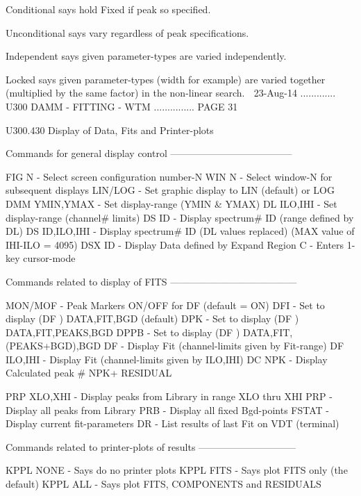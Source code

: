    Conditional says hold Fixed if peak so specified.
 
   Unconditional says vary regardless of peak specifications.
 
   Independent says given parameter-types are varied independently.
 
   Locked  says  given parameter-types (width for example) are varied together
          (multiplied by the same factor) in the non-linear search.
    
   23-Aug-14 ............. U300  DAMM - FITTING - WTM ............... PAGE  31
 
   U300.430  Display of Data, Fits and Printer-plots
 
   Commands for general display control --------------------------------------
 
   FIG    N           - Select screen configuration number-N
   WIN    N           - Select window-N for subsequent displays
   LIN/LOG            - Set graphic display to LIN (default) or LOG
   DMM    YMIN,YMAX   - Set display-range (YMIN & YMAX)
   DL     ILO,IHI     - Set display-range (channel# limits)
   DS     ID          - Display spectrum# ID (range defined by DL)
   DS     ID,ILO,IHI  - Display spectrum# ID (DL values replaced)
                        (MAX value of IHI-ILO = 4095)
   DSX    ID          - Display Data defined by Expand Region
   C                  - Enters 1-key cursor-mode
 
   Commands related to display of FITS ---------------------------------------
 
   MON/MOF            - Peak Markers ON/OFF for DF (default = ON)
   DFI                - Set to display (DF ) DATA,FIT,BGD (default)
   DPK                - Set to display (DF ) DATA,FIT,PEAKS,BGD
   DPPB               - Set to display (DF ) DATA,FIT,(PEAKS+BGD),BGD
   DF                 - Display Fit (channel-limits given by Fit-range)
   DF     ILO,IHI     - Display Fit (channel-limits given by ILO,IHI)
   DC     NPK         - Display Calculated peak #  NPK+ RESIDUAL
 
   PRP    XLO,XHI     - Display peaks from Library in range XLO thru XHI
   PRP                - Display all peaks from Library
   PRB                - Display all fixed Bgd-points
   FSTAT              - Display current fit-parameters
   DR                 - List results of last Fit on VDT (terminal)
 
   Commands related to printer-plots of results ------------------------------
 
   KPPL   NONE        - Says do no printer plots
   KPPL   FITS        - Says plot FITS only (the default)
   KPPL   ALL         - Says plot FITS, COMPONENTS and RESIDUALS
 
